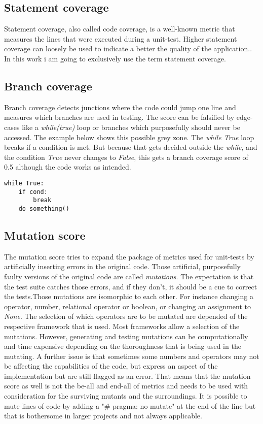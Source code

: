 \documentclass[a4paper,11pt,oneside]{memoir}
\begin{document}
\subsection{Statement coverage}
Statement coverage, also called code coverage, is a well-known metric that measures the lines that were executed during a unit-test. Higher statement coverage can loosely be used to indicate a better the quality of the application.\cite{taufiqurrahmanCodeCoverage}. In this work i am going to exclusively use the term statement coverage. 

\subsection{Branch coverage}
Branch coverage detects junctions where the code could jump one line and measures which branches are used in testing. The score can be falsified by edge-cases like a \textit{while(true)} loop or branches which purposefully should never be accessed.
The example below shows this possible grey zone.
The \textit{while True} loop breaks if a condition is met. But because that gets decided outside the \textit{while}, and the condition \textit{True} never changes to \textit{False}, this gets a branch coverage score of 0.5 although the code works as intended.

\begin{verbatim}
while True:
    if cond:
        break
    do_something()
\end{verbatim}

\subsection{Mutation score}
The mutation score tries to expand the package of metrics used for unit-tests by artificially inserting errors in the original code. Those artificial, purposefully faulty versions of the original code are called \textit{mutations}. The expectation is that the test suite catches those errors, and if they don't, it should be a cue to correct the tests.Those mutations are isomorphic to each other. For instance changing a operator, number, relational operator or boolean, or changing an assignment to \textit{None}. The selection of which operators are to be mutated are depended of the respective framework that is used. Most frameworks allow a selection of the mutations. However, generating and testing mutations can be computationally and time expensive depending on the thoroughness that is being used in the mutating.
A further issue is that sometimes some numbers and operators may not be affecting the capabilities of the code, but express an aspect of the implementation but are still flagged as an error.
That means that the mutation score as well is not the be-all and end-all of metrics and needs to be used with consideration for the surviving mutants and the surroundings. It is possible to mute lines of code by adding a "\# pragma: no mutate" at the end of the line but that is bothersome in larger projects and not always applicable.
\end{document}
